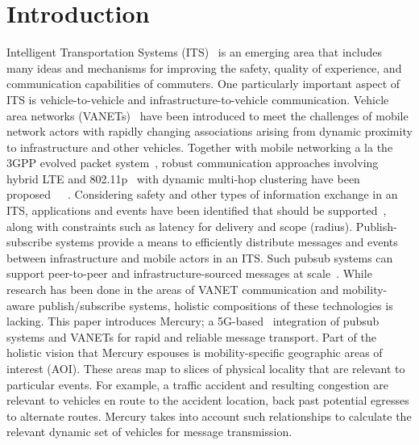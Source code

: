 \section*{Introduction}

Intelligent Transportation Systems (ITS)~\cite{ITS} is an emerging
area that includes many ideas and mechanisms for improving the safety,
quality of experience, and communication capabilities of
commuters. One particularly important aspect of ITS is
vehicle-to-vehicle and infrastructure-to-vehicle
communication. Vehicle area networks (VANETs)~\cite{VANET} have been
introduced to meet the challenges of mobile network actors with
rapidly changing associations arising from dynamic proximity to
infrastructure and other vehicles. Together with mobile networking a
la the 3GPP evolved packet system~\cite{3GPP}, robust communication
approaches involving hybrid LTE and 802.11p~\cite{802.11p} with
dynamic multi-hop clustering have been
proposed~\cite{ucar2016multihop}~\cite{wolny2008modified}~\cite{zhang2011novel}.
Considering safety and
other types of information exchange in an ITS, applications and events
have been identified that should be supported~\cite{vanet-apps}, along
with constraints such as latency for delivery and scope
(radius). Publish-subscribe systems provide a means to efficiently
distribute messages and events between infrastructure and mobile
actors in an ITS. Such pubsub systems can support peer-to-peer and
infrastructure-sourced messages at scale~\cite{nasim2014mobile}.  While
research has been done in the areas of VANET communication and
mobility-aware publish/subscribe systems, holistic compositions of
these technologies is lacking.  This paper introduces Mercury; a
5G-based~\cite{5G} integration of pubsub systems and VANETs for rapid
and reliable message transport.  Part of the holistic vision that
Mercury espouses is mobility-specific geographic areas of interest
(AOI). These areas map to slices of physical locality that are
relevant to particular events.  For example, a traffic accident and
resulting congestion are relevant to vehicles en route to the accident
location, back past potential egresses to alternate routes.  Mercury
takes into account such relationships to calculate the relevant dynamic
set of vehicles for message transmission.

